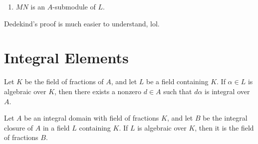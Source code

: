 \begin{enumerate}
    \item \(MN\) is an \(A\)-submodule of \(L\).
\end{enumerate}

Dedekind's proof is much easier to understand, lol.


\section*{Integral Elements}

\begin{proposition}
    Let \(K\) be the field of fractions of \(A\), and let \(L\) be a field containing \(K\). If \(\alpha \in L\) is algebraic over \(K\), then there exists a nonzero \(d \in A\) such that \(d \alpha \) is integral over \(A\).
\end{proposition}

\begin{corollary}
    Let \(A\) be an integral domain with field of fractions \(K\), and let \(B\) be the integral closure of \(A\) in a field \(L\) containing \(K\). If \(L\) is algebraic over \(K\), then it is the field of fractions \(B\).
\end{corollary}

